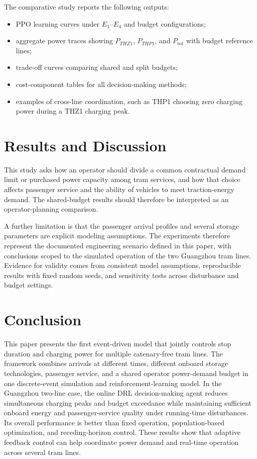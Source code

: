 \documentclass[conference]{IEEEtran}
\newcommand{\thz}{THZ1}
\newcommand{\thp}{THP1}
\begin{document}
The comparative study reports the following outputs:
\begin{itemize}
    \item PPO learning curves under $E_1$--$E_4$ and budget configurations;
    \item aggregate power traces showing $P_{\thz}$, $P_{\thp}$, and $P_{\mathrm{tot}}$ with budget reference lines;
    \item trade-off curves comparing shared and split budgets;
    \item cost-component tables for all decision-making methods;
    \item examples of cross-line coordination, such as \thp{} choosing zero charging power during a \thz{} charging peak.
\end{itemize}

\section{Results and Discussion}
This study asks how an operator should divide a common contractual demand limit or purchased power capacity among tram services, and how that choice affects passenger service and the ability of vehicles to meet traction-energy demand. The shared-budget results should therefore be interpreted as an operator-planning comparison.

A further limitation is that the passenger arrival profiles and several storage parameters are explicit modeling assumptions. The experiments therefore represent the documented engineering scenario defined in this paper, with conclusions scoped to the simulated operation of the two Guangzhou tram lines. Evidence for validity comes from consistent model assumptions, reproducible results with fixed random seeds, and sensitivity tests across disturbance and budget settings.

\section{Conclusion}
This paper presents the first event-driven model that jointly controls stop duration and charging power for multiple catenary-free tram lines. The framework combines arrivals at different times, different onboard storage technologies, passenger service, and a shared operator power-demand budget in one discrete-event simulation and reinforcement-learning model. In the Guangzhou two-line case, the online DRL decision-making agent reduces simultaneous charging peaks and budget exceedance while maintaining sufficient onboard energy and passenger-service quality under running-time disturbances. Its overall performance is better than fixed operation, population-based optimization, and receding-horizon control. These results show that adaptive feedback control can help coordinate power demand and real-time operation across several tram lines.



\end{document}
